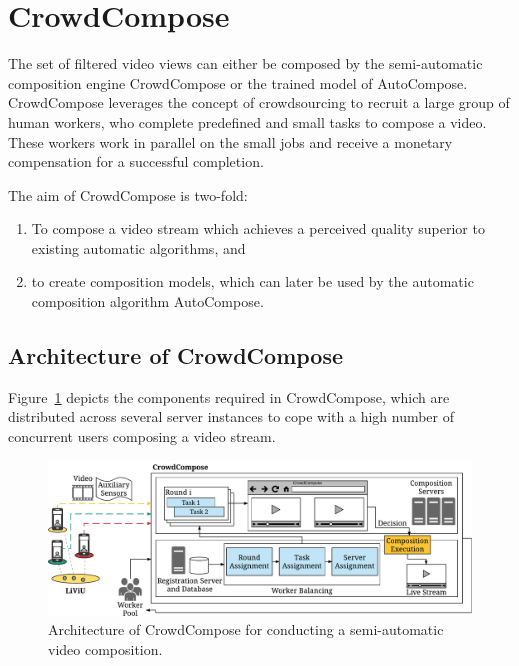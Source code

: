\section{CrowdCompose}
\label{sec:620_System_Architecture}
The set of filtered video views can either be composed by the semi-automatic composition engine CrowdCompose or the trained model of AutoCompose.
CrowdCompose leverages the concept of crowdsourcing to recruit a large group of human workers, who complete predefined and small tasks to compose a video.
These workers work in parallel on the small jobs and receive a monetary compensation for a successful completion. 

The aim of CrowdCompose is two-fold:
\begin{enumerate}
\item To compose a video stream which achieves a perceived quality superior to existing automatic algorithms, and
\item to create composition models, which can later be used by the automatic composition algorithm AutoCompose.
\end{enumerate}

\subsection{Architecture of CrowdCompose}
Figure~\ref{fig:620_Overview_CrowdDirector} depicts the components required in CrowdCompose, which are distributed across several server instances to cope with a high number of concurrent users composing a video stream.
\begin{figure}[!htb]
\centering
\includegraphics[width=\linewidth]{./gfx/600_Composition/Overview_CrowdDirect}
\caption{Architecture of CrowdCompose for conducting a semi-automatic video composition.}
\label{fig:620_Overview_CrowdDirector}
\end{figure}
